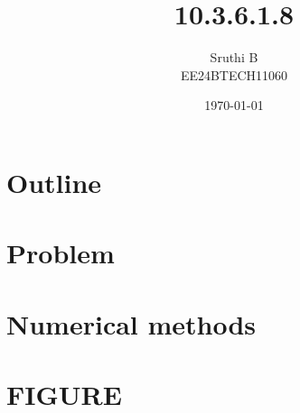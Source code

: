 \documentclass{beamer}
\title{10.3.6.1.8}
\author{Sruthi B \\ EE24BTECH11060\\}
\date{\today}
\theoremstyle{remark}
\numberwithin{equation}{section}
\begin{document}
\begin{frame}
\titlepage
\end{frame}

\section*{Outline}
\begin{frame}
\tableofcontents
\end{frame}
\section{Problem}
\section{Numerical methods}
\section{FIGURE}
\end{document}
